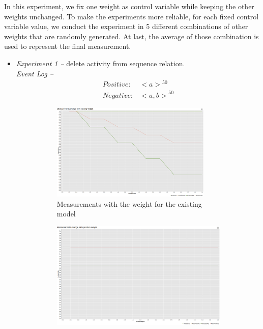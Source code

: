 In this experiment, we fix one weight as control variable while keeping the other weights unchanged. To make the experiments more reliable, for each fixed control variable value, we conduct the experiment in 5 different combinations of other weights that are randomly generated. At last, the average of those combination is used to represent the final measurement.
\begin{itemize}
	\item \emph{Experiment 1 --} delete activity from sequence relation. \\
	\emph{Event Log -- }
	\begin{align*}
	Positive:& {<a>}^{50} \\
	Negative:& {<a, b>}^{50}
	\end{align*}
	\begin{figure}[h]
		\centering
		\begin{subfigure}[b]{\textwidth}
			\centering
			\includegraphics[width=0.9\textwidth, height=0.33\textheight]{figures/evaluation/result-ext-weight-01_log_sequence_02.png}
			\caption{Measurements with the weight for the existing model}
			\label{fig:seq-delete-ext}
		\end{subfigure}
		\hfill
		\begin{subfigure}[b]{\textwidth}
			\centering
			\includegraphics[width=0.9\linewidth,height=0.33\textheight]{figures/evaluation/result-pos-weight-01_log_sequence_02.png}

\end{subfigure}
\end{figure}
\end{itemize}
